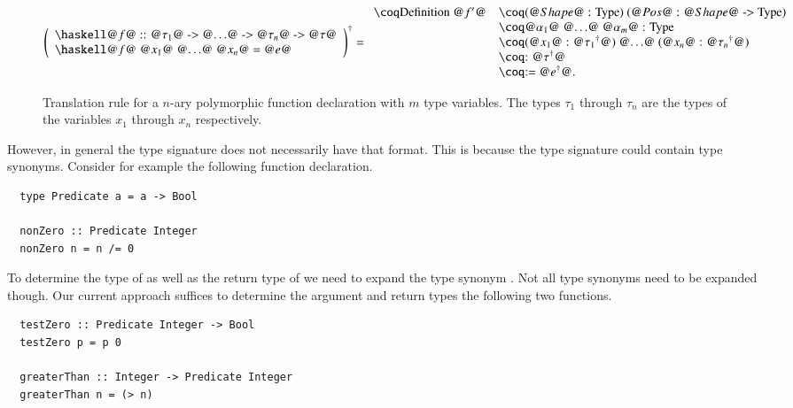 \begin{figure}[H]
  \[
    \toCoq{\left(
      \begin{array}{l}
        \haskellM{@$f$@ :: @$\tau_1$@ -> @$\ldots$@ -> @$\tau_n$@ -> @$\tau$@} \\
        \haskellM{@$f$@ @$x_1$@ @$\ldots$@ @$x_n$@ = @$e$@}
      \end{array}
    \right)}
    = \begin{array}{ll}
        \coqM{Definition @$f'$@}
          &\coqM{(@$\Shape$@ : Type) (@$\Pos$@ : @$\Shape$@ -> Type)}     \\
          &\coqM{{@$\alpha_1$@ @$\ldots$@ @$\alpha_m$@ : Type}}           \\
          &\coqM{(@$x_1$@ : @$\toCoqX{\tau_1}$@) @$\ldots$@ (@$x_n$@ : @$\toCoqX{\tau_n}$@)}                                           \\
          &\coqM{: @$\toCoqX{\tau}$@}                                     \\
          &\coqM{:= @$\toCoqX{e}$@.}                                      \\
      \end{array}
  \]
  \caption{
    Translation rule for a $n$-ary polymorphic function declaration with $m$ type variables.
    The types $\tau_1$ through $\tau_n$ are the types of the variables $x_1$ through $x_n$ respectively.
  }
  \label{fig:translation:func-decl:non-rec}
\end{figure}

However, in general the type signature does not necessarily have that format.
This is because the type signature could contain type synonyms.
Consider for example the following function declaration.
\begin{verbatim}
  type Predicate a = a -> Bool

  nonZero :: Predicate Integer
  nonZero n = n /= 0
\end{verbatim}
To determine the type of  as well as the return type of  we need to expand the type synonym .
Not all type synonyms need to be expanded though.
Our current approach suffices to determine the argument and return types the following two functions.
\begin{verbatim}
  testZero :: Predicate Integer -> Bool
  testZero p = p 0

  greaterThan :: Integer -> Predicate Integer
  greaterThan n = (> n)
\end{verbatim}

